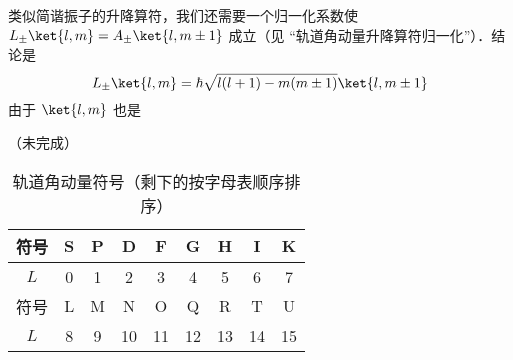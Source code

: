 类似简谐振子的升降算符，我们还需要一个归一化系数使 $L_\pm \ket{l,m} = A_ \pm \ket{l,m \pm 1}$ 成立（见 “轨道角动量升降算符归一化”）．结论是
\begin{equation}
L_\pm \ket{l, m}  = \hbar \sqrt{l(l + 1) - m(m \pm 1)} \ket{l, m \pm 1} 
\end{equation}
由于 $\ket{l,m}$ 也是


（未完成）

\begin{table}[ht]
\centering
\caption{轨道角动量符号（剩下的按字母表顺序排序）}\label{QOrbAM_tab1}
\begin{tabular}{|c|c|c|c|c|c|c|c|c|}
\hline
符号 & S & P & D & F & G & H & I & K\\
\hline
$L$ & 0 & 1 & 2 & 3 & 4 & 5 & 6 & 7\\
\hline
符号 & L & M & N & O & Q & R & T & U \\
\hline
$L$ & 8 & 9 & 10 & 11 & 12 & 13 & 14 & 15 \\
\hline
\end{tabular}
\end{table}
